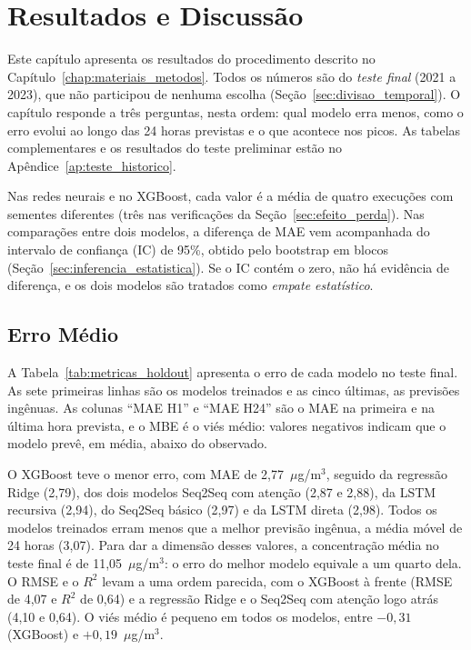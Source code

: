 \chapter{Resultados e Discussão}
\label{chap:resultados}

Este capítulo apresenta os resultados do procedimento descrito no Capítulo~\ref{chap:materiais_metodos}. Todos os números são do \emph{teste final} (2021 a 2023), que não participou de nenhuma escolha (Seção~\ref{sec:divisao_temporal}). O capítulo responde a três perguntas, nesta ordem: qual modelo erra menos, como o erro evolui ao longo das 24 horas previstas e o que acontece nos picos. As tabelas complementares e os resultados do teste preliminar estão no Apêndice~\ref{ap:teste_historico}.

Nas redes neurais e no XGBoost, cada valor é a média de quatro execuções com sementes diferentes (três nas verificações da Seção~\ref{sec:efeito_perda}). Nas comparações entre dois modelos, a diferença de MAE vem acompanhada do intervalo de confiança (IC) de 95\%, obtido pelo bootstrap em blocos (Seção~\ref{sec:inferencia_estatistica}). Se o IC contém o zero, não há evidência de diferença, e os dois modelos são tratados como \emph{empate estatístico}.

\section{Erro Médio}
\label{sec:comparacao_principal}

A Tabela~\ref{tab:metricas_holdout} apresenta o erro de cada modelo no teste final. As sete primeiras linhas são os modelos treinados e as cinco últimas, as previsões ingênuas. As colunas ``MAE H1'' e ``MAE H24'' são o MAE na primeira e na última hora prevista, e o MBE é o viés médio: valores negativos indicam que o modelo prevê, em média, abaixo do observado.


O XGBoost teve o menor erro, com MAE de 2,77~\(\mu\)g/m\(^3\), seguido da regressão Ridge (2,79), dos dois modelos Seq2Seq com atenção (2,87 e 2,88), da LSTM recursiva (2,94), do Seq2Seq básico (2,97) e da LSTM direta (2,98). Todos os modelos treinados erram menos que a melhor previsão ingênua, a média móvel de 24 horas (3,07). Para dar a dimensão desses valores, a concentração média no teste final é de 11,05~\(\mu\)g/m\(^3\): o erro do melhor modelo equivale a um quarto dela. O RMSE e o \(R^2\) levam a uma ordem parecida, com o XGBoost à frente (RMSE de 4,07 e \(R^2\) de 0,64) e a regressão Ridge e o Seq2Seq com atenção logo atrás (4,10 e 0,64). O viés médio é pequeno em todos os modelos, entre \(-0{,}31\) (XGBoost) e \(+0{,}19\)~\(\mu\)g/m\(^3\).

